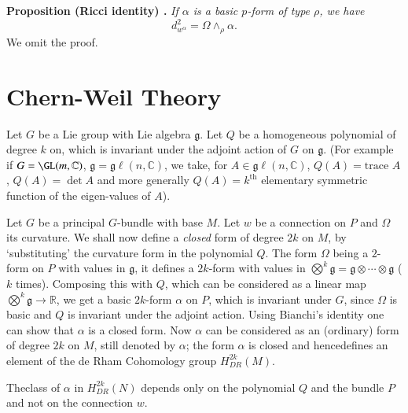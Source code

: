 \noindent
{\bf Proposition (Ricci identity) .\label{sec12-prop12.7}}
{\em If $\alpha$ is a basic $p$-form of type $\rho$, we have}
$$
d^{2}_{w^{\alpha}}=\Omega\wedge_{\rho}\alpha.
$$
We omit the proof.

\section{Chern-Weil Theory}\label{sec13}

Let $G$ be a Lie group with Lie algebra $\mathfrak{g}$. Let $Q$ be a homogeneous polynomial of degree $k$ on, which is invariant under the adjoint action of $G$ on $\mathfrak{g}$. (For example if $G=\GL(m,\mathbb{C})$, $\mathfrak{g}=\mathfrak{g}\ell(n,\mathbb{C})$, we take, for $A\in \mathfrak{g}\ell(n,\mathbb{C})$, $Q(A)=\text{trace~}A$, $Q(A)=\det A$ and more generally $Q(A)=k^{\text{th}}$ elementary symmetric function of the eigen-values of $A$).

Let $G$ be a principal $G$-bundle with base $M$. Let $w$ be a connection on $P$ and $\Omega$ its curvature. We shall now define a {\em closed} form of degree $2k$ on $M$, by `substituting' the curvature form in the polynomial $Q$. The form $\Omega$ being a $2$-form on $P$ with values in $\mathfrak{g}$, it defines a $2k$-form with values in $\bigotimes\limits^{k}\mathfrak{g}=\mathfrak{g}\otimes\cdots\otimes \mathfrak{g}$ ($k$ times). Composing this with $Q$, which can be considered as a linear map $\bigotimes\limits^{k}\mathfrak{g}\to \mathbb{R}$, we get a basic $2k$-form $\alpha$ on $P$, which is invariant under $G$, since $\Omega$ is basic and $Q$ is invariant under the adjoint action. Using Bianchi's identity one can show that $\alpha$ is a closed form. Now $\alpha$ can be considered as an (ordinary) form of degree $2k$ on $M$, still denoted by $\alpha$; the form $\alpha$ is closed and hence\pageoriginale defines an element of the de Rham Cohomology group $H^{2k}_{DR}(M)$.

\begin{theorem}\label{sec13-thm13.1}
The\pageoriginale class of $\alpha$ in $H^{2k}_{DR}(N)$ depends only on the polynomial $Q$ and the bundle $P$ and not on the connection $w$.
\end{theorem}

